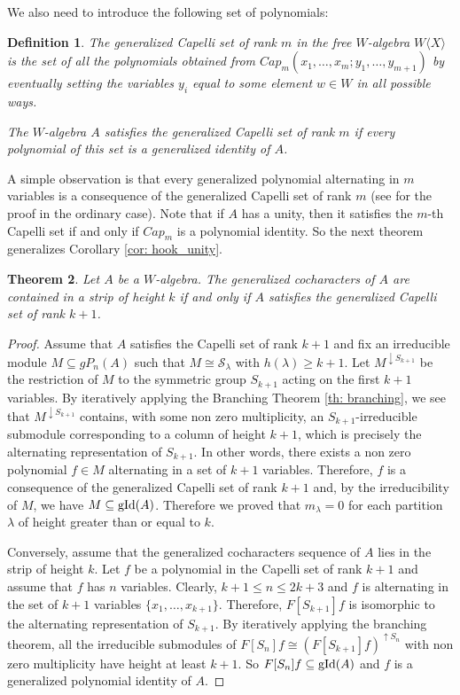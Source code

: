\documentclass{article}
\newtheorem{theorem}{Theorem}[section]
\newtheorem{definition}[theorem]{Definition}
\newcommand{\WX}{W\langle X\rangle}
\newcommand{\cS}{\mathcal{S}}
\DeclareMathOperator{\gid}{\textnormal{gId}}
\begin{document}
We also need to introduce the following set of polynomials:

\begin{definition}
	The generalized Capelli set of rank $m$ in the free $W$-algebra $\WX$ is the set of all the polynomials obtained from $ Cap_m(x_1,\ldots,x_m; y_1,\ldots,y_{m+1})$ by eventually setting the variables $y_i$ equal to some element $w\in W$ in all possible ways.

    The $W$-algebra $A$ satisfies the generalized Capelli set of rank $m$ if every polynomial of this set is a generalized identity of $A$.
\end{definition}

A simple observation is that every generalized polynomial alternating in $m$ variables is a consequence of the generalized Capelli set of rank $m$ (see \cite[Proposition 1.5.5]{GZ05} for the proof in the ordinary case).
Note that if $A$ has a unity, then it satisfies the $m$-th Capelli set if and only if $Cap_m$ is a polynomial identity. So the next theorem generalizes Corollary \ref{cor: hook_unity}.

\begin{theorem} \label{Striptheorem}
    Let $A$ be a $W$-algebra. The generalized cocharacters of $A$ are contained in a strip of height $k$ if and only if $A$ satisfies the generalized Capelli set of rank $k+1$.
\end{theorem}
\begin{proof}
    Assume that $A$ satisfies the Capelli set of rank $k+1$ and fix an irreducible module $M\subseteq gP_n(A)$ such that $M\cong\cS_\lambda$ with $h(\lambda) \geq k+1$. Let $M^{\downarrow S_{k+1}}$ be the restriction  of $M$ to the symmetric group $S_{k+1}$ acting on the first $k+1$ variables. By iteratively applying the Branching Theorem \ref{th: branching}, we see that $M^{\downarrow S_{k+1}}$ contains, with some non zero multiplicity, an $S_{k+1}$-irreducible submodule corresponding to a column of height $k+1$, which is precisely the alternating representation of $S_{k+1}$. In other words, there exists a non zero polynomial $f\in M$ alternating in a set of $k+1$ variables. Therefore, $f$ is a consequence of the generalized Capelli set of rank $k+1$ and, by the irreducibility of $M$, we have $M\subseteq\gid(A)$. Therefore we proved that $m_\lambda=0$ for each partition $\lambda$ of height greater than or equal to $k$.

    Conversely, assume that the generalized cocharacters sequence of $A$ lies in the strip of height $k$. Let $f$ be a polynomial in the Capelli set of rank $k+1$ and assume that $f$ has $n$ variables. Clearly, $k+1\leq n\leq 2k+3$ and $f$ is alternating in the set of $k+1$ variables $\{x_1,\dots,x_{k+1}\}$. Therefore, $F[S_{k+1}]f$ is isomorphic to the alternating representation of $S_{k+1}$. By iteratively applying the branching theorem, all the irreducible submodules of $F[S_n]f\cong(F[S_{k+1}]f)^{\uparrow S_n}$ with non zero multiplicity have height at least $k+1$. So $F[S_n]f \subseteq \gid(A)$ and $f$ is a generalized polynomial identity of $A$.
\end{proof}
\end{document}
